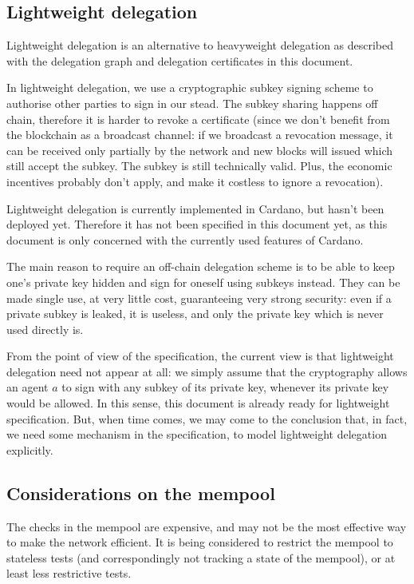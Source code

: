 \documentclass{article}
\begin{document}
\subsection{Lightweight delegation}
\label{sec:lightweight-delegation}

Lightweight delegation is an alternative to heavyweight delegation as
described with the delegation graph and delegation certificates in
this document.

In lightweight delegation, we use a cryptographic subkey signing
scheme to authorise other parties to sign in our stead. The subkey
sharing happens off chain, therefore it is harder to revoke a
certificate (since we don't benefit from the blockchain as a broadcast
channel: if we broadcast a revocation message, it can be received only
partially by the network and new blocks will issued which still accept
the subkey. The subkey is still technically valid. Plus, the economic
incentives probably don't apply, and make it costless to ignore a
revocation).

Lightweight delegation is currently implemented in Cardano, but hasn't
been deployed yet. Therefore it has not been specified in this
document yet, as this document is only concerned with the currently
used features of Cardano.

The main reason to require an off-chain delegation scheme is to be
able to keep one's private key hidden and sign for oneself using
subkeys instead. They can be made single use, at very little cost,
guaranteeing very strong security: even if a private subkey is leaked,
it is useless, and only the private key which is never used directly
is.

From the point of view of the specification, the current view is that
lightweight delegation need not appear at all: we simply assume that
the cryptography allows an agent $a$ to sign with any subkey of its
private key, whenever its private key would be allowed. In this sense,
this document is already ready for lightweight specification. But,
when time comes, we may come to the conclusion that, in fact, we need
some mechanism in the specification, to model lightweight delegation
explicitly.

\subsection{Considerations on the mempool}
\label{sec:appendix-mempool}

The checks in the mempool are expensive, and may not be the most
effective way to make the network efficient. It is being considered to
restrict the mempool to stateless tests (and correspondingly not
tracking a state of the mempool), or at least less restrictive tests.
\end{document}
